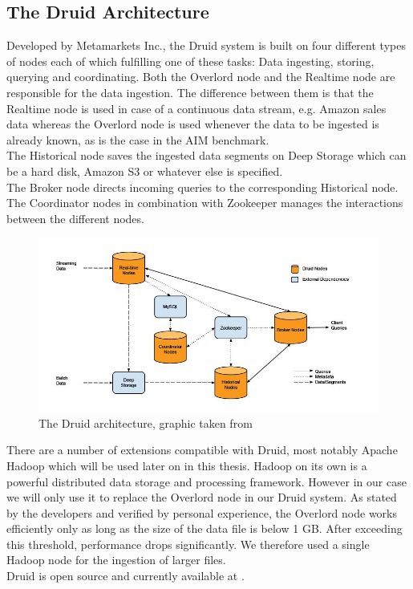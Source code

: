 \documentclass[11pt,singlecolumn]{scrartcl}
\begin{document}
\clearpage

\subsection{The Druid Architecture}
Developed by Metamarkets Inc., the Druid system \cite{druid} is built on four different types of nodes each of which fulfilling one of these tasks: Data ingesting, storing, querying and coordinating. Both the Overlord node and the Realtime node are responsible for the data ingestion. The difference between them is that the Realtime node is used in case of a continuous data stream, e.g. Amazon sales data whereas the Overlord node is used whenever the data to be ingested is already known, as is the case in the AIM benchmark.\\
The Historical node saves the ingested data segments on Deep Storage which can be a hard disk, Amazon S3 or whatever else is specified.\\
The Broker node directs incoming queries to the corresponding Historical node.\\
The Coordinator nodes in combination with Zookeeper \cite{zoo} manages the interactions between the different nodes.\\


\begin{figure}[h]
\includegraphics[scale=0.65]{druid.jpg}
\caption{The Druid architecture, graphic taken from \cite{druid}}
\end{figure}

There are a number of extensions compatible with Druid, most notably Apache Hadoop \cite{hadoop} which will be used later on in this thesis. Hadoop on its own is a powerful distributed data storage and processing framework. However in our case we will only use it to replace the Overlord node in our Druid system. As stated by the developers and verified by personal experience, the Overlord node works efficiently only as long as the size of the data file is below 1 GB. After exceeding this threshold, performance drops significantly. We therefore used a single Hadoop node for the ingestion of larger files.
\\[1cm]
Druid is open source and currently available at \cite{druidon}.
\end{document}
